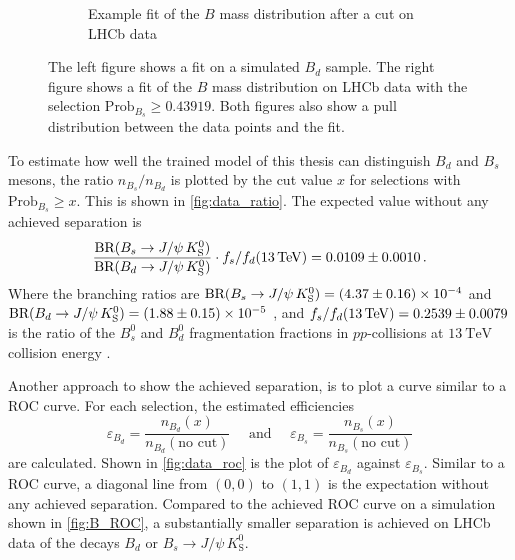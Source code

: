 \begin{figure}
\begin{subfigure}{0.5\textwidth}
        \caption{Example fit of the $B$ mass distribution after a cut on LHCb data}
        \label{fig:fit_example}
    \end{subfigure}%
    \caption{The left figure shows a fit on a simulated $B_d$ sample. The right figure shows a fit of the $B$ mass distribution on LHCb data with the selection $\text{Prob}_{B_s} \geq 0.43919$. Both figures also show a pull distribution between the data points and the fit.}
\end{figure}

To estimate how well the trained model of this thesis can distinguish $B_d$ and $B_s$ mesons, the ratio $n_{B_s}/n_{B_d}$ is plotted by the cut value $x$ for selections with $\text{Prob}_{B_s} \geq x$. 
This is shown in \cref{fig:data_ratio}.
The expected value without any achieved separation is 
\begin{equation}
    \frac{\text{BR}(B_s \rightarrow J/\psi \, K^0_\text{S})}{\text{BR}(B_d \rightarrow J/\psi \, K^0_\text{S})} \cdot 
    f_s/f_d(\qty{13}{\TeV}) = \num{0.0109\pm0.0010} \, .
\end{equation}
Where the branching ratios are $\text{BR}(B_s \rightarrow J/\psi \, K^0_\text{S}) = \num{4.37\pm0.16e-4}$ and $\text{BR}(B_d \rightarrow J/\psi \, K^0_\text{S}) = \num{1.88\pm0.15e-5}$ \cite{pdg}, and $f_s/f_d(\qty{13}{\TeV}) = \num{0.2539\pm0.0079}$ is the ratio of the $B^0_s$ and $B^0_d$ fragmentation fractions in $pp$-collisions at $\qty{13}{\TeV}$ collision energy \cite{fsfd}.

Another approach to show the achieved separation, is to plot a curve similar to a ROC curve. 
For each selection, the estimated efficiencies
\begin{equation}
    \varepsilon_{B_d} = \frac{n_{B_d}(x)}{n_{B_d}(\text{no cut})} \quad\text{ and }\quad \varepsilon_{B_s} = \frac{n_{B_s}(x)}{n_{B_s}(\text{no cut})}
\end{equation}
are calculated. Shown in \cref{fig:data_roc} is the plot of $\varepsilon_{B_d}$ against $\varepsilon_{B_s}$.
Similar to a ROC curve, a diagonal line from $(0,0)$ to $(1,1)$ is the expectation without any achieved separation.
Compared to the achieved ROC curve on a simulation shown in \cref{fig:B_ROC}, a substantially smaller separation is achieved on LHCb data of the decays $B_d \text{ or } B_s \rightarrow J/\psi \, K^0_\text{S}$.

